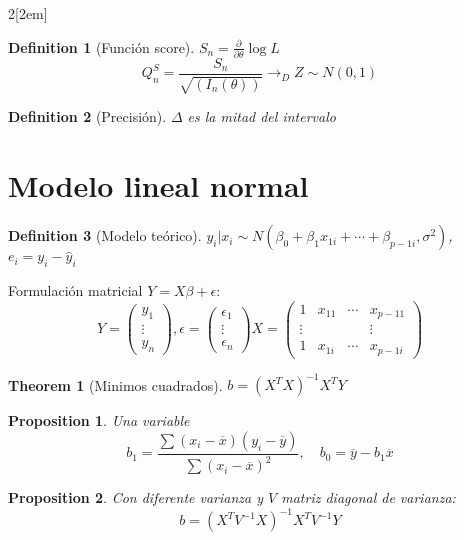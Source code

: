 \documentclass[leqno]{article}
\newtheorem*{theorem}{Theorem}
\newtheorem*{proposition}{Proposition}
\newtheorem*{definition}{Definition}
\begin{document}
\begin{multicols}{2}[\columnsep2em]
\begin{definition}[Función score] $S_n = \frac{\partial}{\partial \theta } \log L$
  \[
	Q_n^{S} = \frac{S_n}{\sqrt{(I_n(\theta ))} } \to _D Z \sim N(0,1)
  \] 
\end{definition}

\begin{definition}[Precisión] $\Delta $ es la mitad del intervalo
\end{definition}


\section{Modelo lineal normal}

\begin{definition}[Modelo teórico] $y_i|x_i \sim N(\beta _0+ \beta_1x_{1i}+ \cdots + \beta_{p-1i}, \sigma ^2)$, $e_i = y_i-\hat{y}_i$
\end{definition}

Formulación matricial $Y = X\beta + \epsilon$:
\[
Y = \begin{pmatrix} y_1 \\ \vdots \\ y_n \end{pmatrix} , \epsilon = \begin{pmatrix} \epsilon_1\\ \vdots \\ \epsilon_n \end{pmatrix} 
X = \begin{pmatrix} 1 & x_{11} & \cdots & x_{p-11} \\ \vdots & & & \vdots \\ 1 & x_{1i} & \cdots & x_{p-1i} \end{pmatrix} 
\] 
\begin{theorem}[Minimos cuadrados] $ b = (X^TX)^{-1}X^TY$
\end{theorem}

\begin{proposition} Una variable
\[
b_1 = \frac{\sum (x_i-\overline{x})(y_i-\overline{y})}{\sum (x_i-\overline{x})^2}, \quad b_0 = \overline{y} - b_1 \overline{x}
\]  
\end{proposition}

\begin{proposition} Con diferente varianza y $V$ matriz diagonal de varianza:
\[
b = (X^TV^{-1}X)^{-1}X^TV^{-1}Y
\] 
\end{proposition}






\end{multicols}
\end{document}
